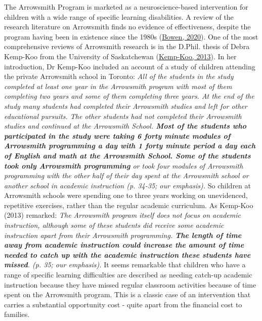 \documentclass{krantz}
\begin{document}
\begin{tcolorbox}[colback=Black!5!lightgray,colframe=black!75!black,coltitle=white,title=Opportunity Costs in the Arrowsmith Program]\label{box:Arrowsmith}
The Arrowsmith Program is marketed as a neuroscience-based intervention for children with a wide range of specific learning disabilities. A review of the research literature on Arrowsmith finds no evidence of effectiveness, despite the program having been in existence since the 1980s (\protect\hyperlink{ref-bowen2020}{Bowen, 2020}). One of the most comprehensive reviews of Arrowsmith research is in the D.Phil. thesis of Debra Kemp-Koo from the University of Saskatchewan (\protect\hyperlink{ref-kemp-koo2013}{Kemp-Koo, 2013}). In her introduction, Dr Kemp-Koo included an account of a study of children attending the private Arrowsmith school in Toronto: \textit{All of the students in the study completed at least one year in the Arrowsmith program with most of them completing two years and some of them completing three years. At the end of the study many students had completed their Arrowsmith studies and left for other educational pursuits. The other students had not completed their Arrowsmith studies and continued at the Arrowsmith School. \textbf{Most of the students who participated in the study were taking 6 forty minute modules of Arrowsmith programming a day with 1 forty minute period a day each of English and math at the Arrowsmith School. Some of the students took only Arrowsmith programming} or took four modules of Arrowsmith programming with the other half of their day spent at the Arrowsmith school or another school in academic instruction (p. 34-35; our emphasis).}
So children at Arrowsmith schools were spending one to three years working on unevidenced, repetitive exercises, rather than the regular academic curriculum. As Kemp-Koo (2013) remarked: \textit{The Arrowsmith program itself does not focus on academic instruction, although some of these students did receive some academic instruction apart from their Arrowsmith programming. \textbf{The length of time away from academic instruction could increase the amount of time needed to catch up with the academic instruction these students have missed}. (p. 35; our emphasis).}  
It seems remarkable that children who have a range of specific learning difficulties are described as needing catch-up academic instruction because they have missed regular classroom activities because of time spent on the Arrowsmith program. This is a classic case of an intervention that carries a substantial opportunity cost - quite apart from the financial cost to families.  
\end{tcolorbox}
\end{document}
